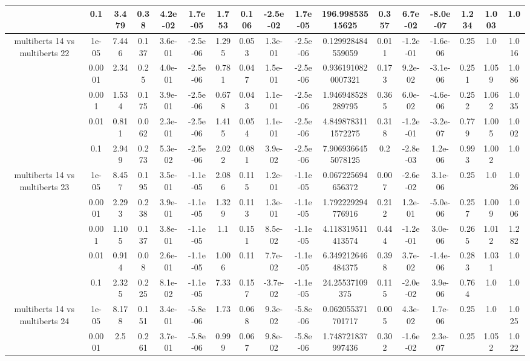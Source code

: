 \begin{tabular}{|c|c|c|c|c|c|c|c|c|c|c|c|c|c|c|c|c|}
 & 0.1 & 3.479 & 0.38 & 4.2e-02 & 1.7e-05 & 1.753 & 0.106 & -2.5e-02 & 1.7e-05 & 196.99853515625 & 0.357 & 6.7e-02 & -8.0e-07 & 1.234 & 1.003 & 1.0 \\
\hline
\multirow{5}{*}{multiberts 14 vs multiberts 22} & 1e-05 & 7.446 & 0.137 & 3.6e-01 & -2.5e-06 & 1.295 & 0.053 & 1.3e-01 & -2.5e-06 & 0.129928484559059 & 0.011 & -1.2e-01 & -1.6e-06 & 0.25 & 1.0 & 1.016 \\
 & 0.0001 & 2.34 & 0.25 & 4.0e-01 & -2.5e-06 & 0.781 & 0.047 & 1.5e-01 & -2.5e-06 & 0.9361910820007321 & 0.173 & 9.2e-02 & -3.1e-06 & 0.251 & 1.059 & 1.086 \\
 & 0.001 & 1.534 & 0.175 & 3.9e-01 & -2.5e-06 & 0.678 & 0.043 & 1.1e-01 & -2.5e-06 & 1.946948528289795 & 0.365 & 6.0e-02 & -4.6e-06 & 0.252 & 1.062 & 1.035 \\
 & 0.01 & 0.811 & 0.062 & 2.3e-01 & -2.5e-06 & 1.415 & 0.054 & 1.1e-01 & -2.5e-06 & 4.8498783111572275 & 0.318 & -1.2e-01 & -3.2e-07 & 0.779 & 1.005 & 1.002 \\
 & 0.1 & 2.949 & 0.273 & 5.3e-02 & -2.5e-06 & 2.022 & 0.081 & 3.9e-02 & -2.5e-06 & 7.9069366455078125 & 0.2 & -2.8e-03 & 1.2e-06 & 0.993 & 1.002 & 1.0 \\
\hline
\multirow{5}{*}{multiberts 14 vs multiberts 23} & 1e-05 & 8.457 & 0.195 & 3.5e-01 & -1.1e-05 & 2.086 & 0.115 & 1.2e-01 & -1.1e-05 & 0.067225694656372 & 0.007 & -2.6e-02 & 3.1e-06 & 0.25 & 1.0 & 1.026 \\
 & 0.0001 & 2.293 & 0.238 & 3.9e-01 & -1.1e-05 & 1.329 & 0.113 & 1.3e-01 & -1.1e-05 & 1.792229294776916 & 0.212 & 1.2e-01 & -5.0e-06 & 0.257 & 1.009 & 1.006 \\
 & 0.001 & 1.105 & 0.137 & 3.8e-01 & -1.1e-05 & 1.1 & 0.151 & 8.5e-02 & -1.1e-05 & 4.118319511413574 & 0.444 & -1.2e-01 & 3.0e-06 & 0.265 & 1.012 & 1.282 \\
 & 0.01 & 0.914 & 0.08 & 2.6e-01 & -1.1e-05 & 1.006 & 0.11 & 7.7e-02 & -1.1e-05 & 6.349212646484375 & 0.398 & 3.7e-02 & -1.4e-06 & 0.283 & 1.031 & 1.0 \\
 & 0.1 & 2.325 & 0.225 & 8.1e-02 & -1.1e-05 & 7.33 & 0.157 & -3.7e-02 & -1.1e-05 & 24.25537109375 & 0.115 & -2.0e-02 & 3.9e-06 & 0.764 & 1.0 & 1.0 \\
\hline
\multirow{5}{*}{multiberts 14 vs multiberts 24} & 1e-05 & 8.178 & 0.151 & 3.4e-01 & -5.8e-06 & 1.73 & 0.068 & 9.3e-02 & -5.8e-06 & 0.062055371701717 & 0.005 & 4.3e-02 & 1.7e-06 & 0.25 & 1.0 & 1.025 \\
 & 0.0001 & 2.5 & 0.261 & 3.7e-01 & -5.8e-06 & 0.999 & 0.067 & 9.8e-02 & -5.8e-06 & 1.748721837997436 & 0.302 & -1.6e-02 & 2.3e-07 & 0.25 & 1.052 & 1.022 \\

\end{tabular}
